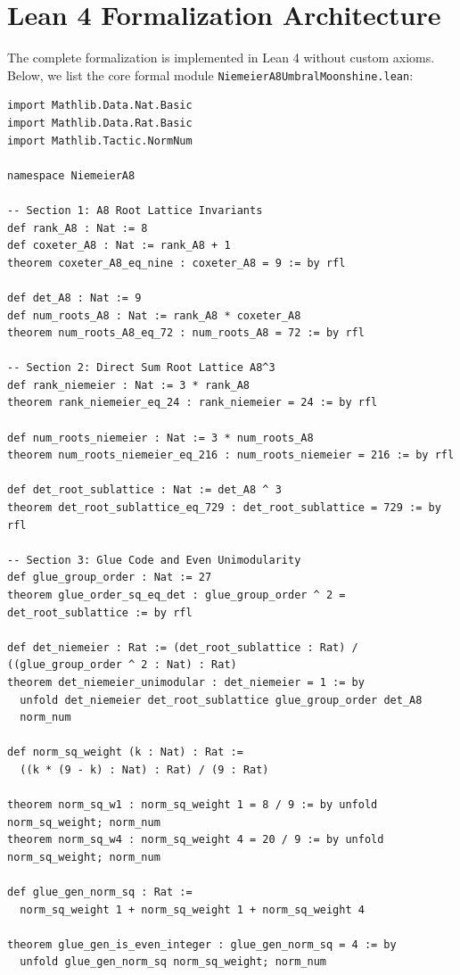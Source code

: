 \documentclass[11pt,a4paper]{article}
\begin{document}
\section{Lean 4 Formalization Architecture}

The complete formalization is implemented in Lean 4 without custom axioms. Below, we list the core formal module \texttt{NiemeierA8UmbralMoonshine.lean}:

\begin{lstlisting}[language=lean4]
import Mathlib.Data.Nat.Basic
import Mathlib.Data.Rat.Basic
import Mathlib.Tactic.NormNum

namespace NiemeierA8

-- Section 1: A8 Root Lattice Invariants
def rank_A8 : Nat := 8
def coxeter_A8 : Nat := rank_A8 + 1
theorem coxeter_A8_eq_nine : coxeter_A8 = 9 := by rfl

def det_A8 : Nat := 9
def num_roots_A8 : Nat := rank_A8 * coxeter_A8
theorem num_roots_A8_eq_72 : num_roots_A8 = 72 := by rfl

-- Section 2: Direct Sum Root Lattice A8^3
def rank_niemeier : Nat := 3 * rank_A8
theorem rank_niemeier_eq_24 : rank_niemeier = 24 := by rfl

def num_roots_niemeier : Nat := 3 * num_roots_A8
theorem num_roots_niemeier_eq_216 : num_roots_niemeier = 216 := by rfl

def det_root_sublattice : Nat := det_A8 ^ 3
theorem det_root_sublattice_eq_729 : det_root_sublattice = 729 := by rfl

-- Section 3: Glue Code and Even Unimodularity
def glue_group_order : Nat := 27
theorem glue_order_sq_eq_det : glue_group_order ^ 2 = det_root_sublattice := by rfl

def det_niemeier : Rat := (det_root_sublattice : Rat) / ((glue_group_order ^ 2 : Nat) : Rat)
theorem det_niemeier_unimodular : det_niemeier = 1 := by
  unfold det_niemeier det_root_sublattice glue_group_order det_A8
  norm_num

def norm_sq_weight (k : Nat) : Rat :=
  ((k * (9 - k) : Nat) : Rat) / (9 : Rat)

theorem norm_sq_w1 : norm_sq_weight 1 = 8 / 9 := by unfold norm_sq_weight; norm_num
theorem norm_sq_w4 : norm_sq_weight 4 = 20 / 9 := by unfold norm_sq_weight; norm_num

def glue_gen_norm_sq : Rat :=
  norm_sq_weight 1 + norm_sq_weight 1 + norm_sq_weight 4

theorem glue_gen_is_even_integer : glue_gen_norm_sq = 4 := by
  unfold glue_gen_norm_sq norm_sq_weight; norm_num


\end{lstlisting}
\end{document}
